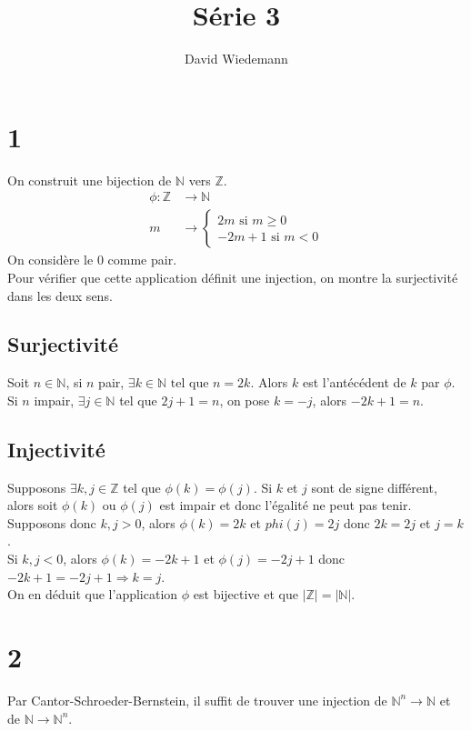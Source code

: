 \documentclass[11pt, a4paper, twoside]{article}
\begin{document}
\title{Série 3}
\author{David Wiedemann}
\maketitle
\section*{1}
On construit une bijection de $\mathbb{N}$ vers $\mathbb{Z}$.\\
\begin{align*}
	\phi \colon \mathbb{Z} &\to \mathbb{N}\\
	m & \to 
	\begin{cases}
	2m \text{ si } m \geq 0\\
	-2m +1 \text{ si } m < 0
	\end{cases}
\end{align*}
On considère le 0 comme pair.\\
Pour vérifier que cette application définit une injection, on montre la surjectivité dans les deux sens.\\
\subsection*{Surjectivité}
Soit $n \in \mathbb{N}$, si $n$ pair, $\exists k \in \mathbb{N} \text{ tel que } n = 2k$. Alors $k$ est l'antécédent de $k$ par $\phi$.\\
Si $n$ impair, $\exists j \in \mathbb{N}$ tel que $2j+1=n$, on pose $k=-j$, alors $-2k+1 =n$.
\subsection*{Injectivité}
Supposons $\exists k,j \in \mathbb{Z}$ tel que $\phi(k)=\phi(j)$. Si $k$ et $j$ sont de signe différent, alors soit $\phi(k)$ ou $\phi(j)$ est impair et donc l'égalité ne peut pas tenir.\\
Supposons donc $k, j  > 0$, alors $\phi(k) = 2k $ et $phi(j) = 2j$ donc $2k=2j$ et $j=k$.\\
Si $k, j <0 $, alors $\phi(k) = -2k + 1$ et $\phi(j) = -2j +1$ donc $-2k+1 = -2j + 1 \Rightarrow k =j$.	\\

On en déduit que l'application $\phi$ est bijective et que $|\mathbb{Z}| = |\mathbb{N}|$.
\section*{2}
Par Cantor-Schroeder-Bernstein, il suffit de trouver une injection de $ \mathbb{N}^{n} \to \mathbb{N}$
et de $\mathbb{N} \to \mathbb{N}^{n}$.\\
\end{document}
